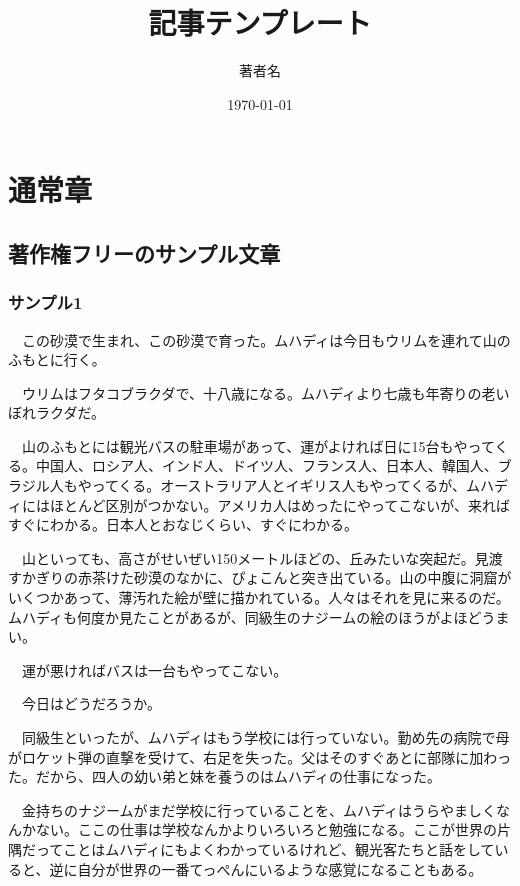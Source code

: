 \documentclass[11pt,a4paper]{ltjsarticle}
\title{記事テンプレート}
\author{著者名}
\date{\today}
\begin{document}
\maketitle
\tableofcontents

\section{通常章}

\subsection{著作権フリーのサンプル文章}

\subsubsection{サンプル1}

　この砂漠で生まれ、この砂漠で育った。ムハディは今日もウリムを連れて山のふもとに行く。

　ウリムはフタコブラクダで、十八歳になる。ムハディより七歳も年寄りの老いぼれラクダだ。

　山のふもとには観光バスの駐車場があって、運がよければ日に15台もやってくる。中国人、ロシア人、インド人、ドイツ人、フランス人、日本人、韓国人、ブラジル人もやってくる。オーストラリア人とイギリス人もやってくるが、ムハディにはほとんど区別がつかない。アメリカ人はめったにやってこないが、来ればすぐにわかる。日本人とおなじくらい、すぐにわかる。

　山といっても、高さがせいぜい150メートルほどの、丘みたいな突起だ。見渡すかぎりの赤茶けた砂漠のなかに、ぴょこんと突き出ている。山の中腹に洞窟がいくつかあって、薄汚れた絵が壁に描かれている。人々はそれを見に来るのだ。ムハディも何度か見たことがあるが、同級生のナジームの絵のほうがよほどうまい。

　運が悪ければバスは一台もやってこない。

　今日はどうだろうか。

　同級生といったが、ムハディはもう学校には行っていない。勤め先の病院で母がロケット弾の直撃を受けて、右足を失った。父はそのすぐあとに部隊に加わった。だから、四人の幼い弟と妹を養うのはムハディの仕事になった。

　金持ちのナジームがまだ学校に行っていることを、ムハディはうらやましくなんかない。ここの仕事は学校なんかよりいろいろと勉強になる。ここが世界の片隅だってことはムハディにもよくわかっているけれど、観光客たちと話をしていると、逆に自分が世界の一番てっぺんにいるような感覚になることもある。
\end{document}
